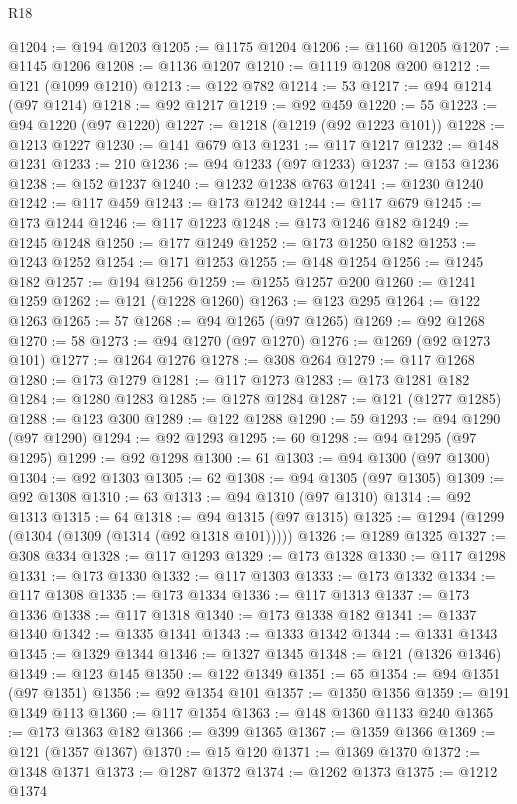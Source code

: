 \begin{lexlean}{R18}
\begin{coremodule}
@1204 := @194 @1203
@1205 := @1175 @1204
@1206 := @1160 @1205
@1207 := @1145 @1206
@1208 := @1136 @1207
@1210 := @1119 @1208 @200
@1212 := @121 (@1099 @1210)
@1213 := @122 @782
@1214 := 53
@1217 := @94 @1214 (@97 @1214)
@1218 := @92 @1217
@1219 := @92 @459
@1220 := 55
@1223 := @94 @1220 (@97 @1220)
@1227 := @1218 (@1219 (@92 @1223 @101))
@1228 := @1213 @1227
@1230 := @141 @679 @13
@1231 := @117 @1217
@1232 := @148 @1231
@1233 := 210
@1236 := @94 @1233 (@97 @1233)
@1237 := @153 @1236
@1238 := @152 @1237
@1240 := @1232 @1238 @763
@1241 := @1230 @1240
@1242 := @117 @459
@1243 := @173 @1242
@1244 := @117 @679
@1245 := @173 @1244
@1246 := @117 @1223
@1248 := @173 @1246 @182
@1249 := @1245 @1248
@1250 := @177 @1249
@1252 := @173 @1250 @182
@1253 := @1243 @1252
@1254 := @171 @1253
@1255 := @148 @1254
@1256 := @1245 @182
@1257 := @194 @1256
@1259 := @1255 @1257 @200
@1260 := @1241 @1259
@1262 := @121 (@1228 @1260)
@1263 := @123 @295
@1264 := @122 @1263
@1265 := 57
@1268 := @94 @1265 (@97 @1265)
@1269 := @92 @1268
@1270 := 58
@1273 := @94 @1270 (@97 @1270)
@1276 := @1269 (@92 @1273 @101)
@1277 := @1264 @1276
@1278 := @308 @264
@1279 := @117 @1268
@1280 := @173 @1279
@1281 := @117 @1273
@1283 := @173 @1281 @182
@1284 := @1280 @1283
@1285 := @1278 @1284
@1287 := @121 (@1277 @1285)
@1288 := @123 @300
@1289 := @122 @1288
@1290 := 59
@1293 := @94 @1290 (@97 @1290)
@1294 := @92 @1293
@1295 := 60
@1298 := @94 @1295 (@97 @1295)
@1299 := @92 @1298
@1300 := 61
@1303 := @94 @1300 (@97 @1300)
@1304 := @92 @1303
@1305 := 62
@1308 := @94 @1305 (@97 @1305)
@1309 := @92 @1308
@1310 := 63
@1313 := @94 @1310 (@97 @1310)
@1314 := @92 @1313
@1315 := 64
@1318 := @94 @1315 (@97 @1315)
@1325 := @1294 (@1299 (@1304 (@1309 (@1314 (@92 @1318 @101)))))
@1326 := @1289 @1325
@1327 := @308 @334
@1328 := @117 @1293
@1329 := @173 @1328
@1330 := @117 @1298
@1331 := @173 @1330
@1332 := @117 @1303
@1333 := @173 @1332
@1334 := @117 @1308
@1335 := @173 @1334
@1336 := @117 @1313
@1337 := @173 @1336
@1338 := @117 @1318
@1340 := @173 @1338 @182
@1341 := @1337 @1340
@1342 := @1335 @1341
@1343 := @1333 @1342
@1344 := @1331 @1343
@1345 := @1329 @1344
@1346 := @1327 @1345
@1348 := @121 (@1326 @1346)
@1349 := @123 @145
@1350 := @122 @1349
@1351 := 65
@1354 := @94 @1351 (@97 @1351)
@1356 := @92 @1354 @101
@1357 := @1350 @1356
@1359 := @191 @1349 @113
@1360 := @117 @1354
@1363 := @148 @1360 @1133 @240
@1365 := @173 @1363 @182
@1366 := @399 @1365
@1367 := @1359 @1366
@1369 := @121 (@1357 @1367)
@1370 := @15 @120
@1371 := @1369 @1370
@1372 := @1348 @1371
@1373 := @1287 @1372
@1374 := @1262 @1373
@1375 := @1212 @1374

\end{coremodule}
\end{lexlean}
